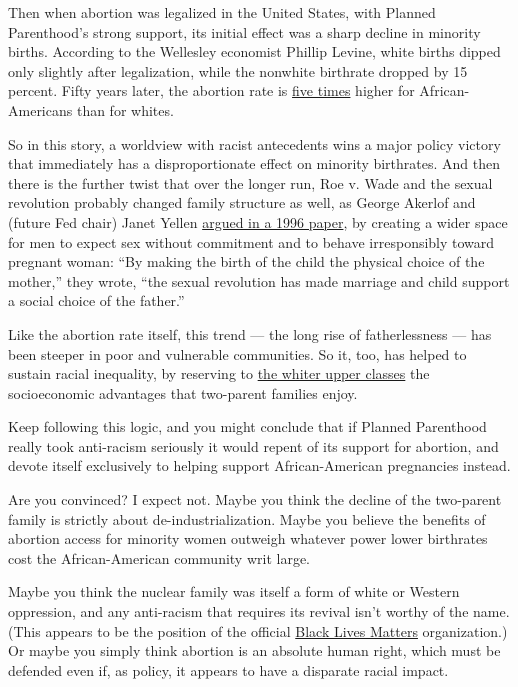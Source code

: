Then when abortion was legalized in the United States, with Planned
Parenthood's strong support, its initial effect was a sharp decline in
minority births. According to the Wellesley economist Phillip Levine,
white births dipped only slightly after legalization, while the nonwhite
birthrate dropped by 15 percent. Fifty years later, the abortion rate is
\href{https://www.theatlantic.com/health/archive/2014/09/abortions-racial-gap/380251/}{five
times} higher for African-Americans than for whites.

So in this story, a worldview with racist antecedents wins a major
policy victory that immediately has a disproportionate effect on
minority birthrates. And then there is the further twist that over the
longer run, Roe v. Wade and the sexual revolution probably changed
family structure as well, as George Akerlof and (future Fed chair) Janet
Yellen
\href{https://www.brookings.edu/research/an-analysis-of-out-of-wedlock-births-in-the-united-states/}{argued
in a 1996 paper}, by creating a wider space for men to expect sex
without commitment and to behave irresponsibly toward pregnant woman:
``By making the birth of the child the physical choice of the mother,''
they wrote, ``the sexual revolution has made marriage and child support
a social choice of the father.''

Like the abortion rate itself, this trend --- the long rise of
fatherlessness --- has been steeper in poor and vulnerable communities.
So it, too, has helped to sustain racial inequality, by reserving to
\href{https://douthat.blogs.nytimes.com/2014/01/29/social-liberalism-as-class-warfare/}{the
whiter upper classes} the socioeconomic advantages that two-parent
families enjoy.

Keep following this logic, and you might conclude that if Planned
Parenthood really took anti-racism seriously it would repent of its
support for abortion, and devote itself exclusively to helping support
African-American pregnancies instead.

Are you convinced? I expect not. Maybe you think the decline of the
two-parent family is strictly about de-industrialization. Maybe you
believe the benefits of abortion access for minority women outweigh
whatever power lower birthrates cost the African-American community writ
large.

Maybe you think the nuclear family was itself a form of white or Western
oppression, and any anti-racism that requires its revival isn't worthy
of the name. (This appears to be the position of the official
\href{https://blacklivesmatter.com/what-we-believe/}{Black Lives
Matters} organization.) Or maybe you simply think abortion is an
absolute human right, which must be defended even if, as policy, it
appears to have a disparate racial impact.


